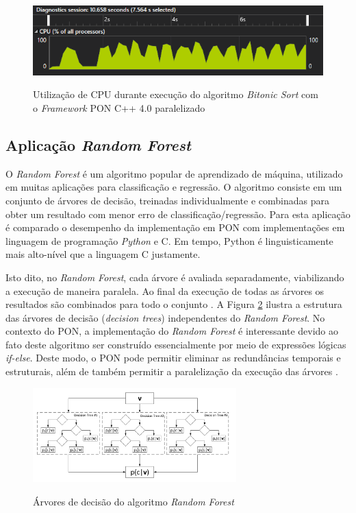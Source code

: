 \begin{figure}[!htb]
\centering
\caption{Utilização de CPU durante execução do algoritmo \textit{Bitonic Sort}
com o \textit{Framework} PON C++ 4.0 paralelizado}
\includegraphics[width=\textwidth]{../figures/cpu_bitonic_par.png}
\smallskip
{}
\label{fig:bit_cpu_par}
\end{figure}

\subsection{Aplicação \textit{Random Forest}}\label{sec:random_forest}

O \textit{Random Forest} é um algoritmo popular de aprendizado de máquina,
utilizado em muitas aplicações para classificação e regressão. O algoritmo
consiste em um conjunto de árvores de decisão, treinadas individualmente e
combinadas para obter um resultado com menor erro de classificação/regressão.
Para esta aplicação é comparado o desempenho da implementação em PON com
implementações em linguagem de programação \textit{Python} e C. Em tempo, Python
é linguisticamente mais alto-nível que a linguagem C justamente.

Isto dito, no \textit{Random Forest}, cada árvore é avaliada separadamente,
viabilizando a execução de maneira paralela. Ao final da execução de todas as
árvores os resultados são combinados para todo o conjunto \cite{criminisi_2011}.
A Figura \ref{fig:random_forest} ilustra a estrutura das árvores de decisão
(\textit{decision trees}) independentes do \textit{Random Forest}. No contexto
do PON, a implementação do \textit{Random Forest} é interessante devido ao fato
deste algoritmo ser construído essencialmente por meio de expressões lógicas
\textit{if-else}. Deste modo, o PON pode permitir eliminar as redundâncias
temporais e estruturais, além de também permitir a paralelização da execução das
árvores \cite{quali_pordeus_2020}.

\begin{figure}[!htb]
  \centering
  \caption{Árvores de decisão do algoritmo \textit{Random Forest}}
  \includegraphics[width=0.7\textwidth]{../figures/random_forest.png}
  \smallskip
  \label{fig:random_forest}
  \end{figure}

